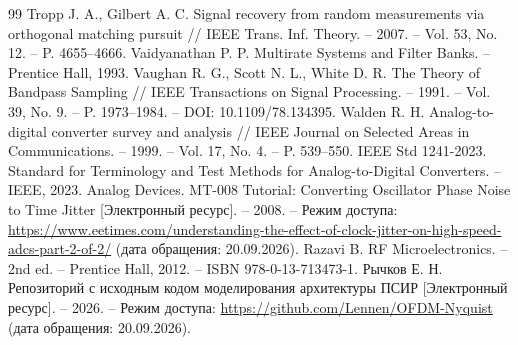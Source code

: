 \documentclass[a4paper,12pt]{article}
\numberwithin{equation}{section}
\begin{document}
\begin{thebibliography}{99}
Tropp J. A., Gilbert A. C. Signal recovery from random measurements via orthogonal matching pursuit // IEEE Trans. Inf. Theory. -- 2007. -- Vol. 53, No. 12. -- P. 4655--4666.
Vaidyanathan P. P. Multirate Systems and Filter Banks. -- Prentice Hall, 1993.
Vaughan R. G., Scott N. L., White D. R. The Theory of Bandpass Sampling // IEEE Transactions on Signal Processing. -- 1991. -- Vol. 39, No. 9. -- P. 1973--1984. -- DOI: 10.1109/78.134395.
Walden R. H. Analog-to-digital converter survey and analysis // IEEE Journal on Selected Areas in Communications. -- 1999. -- Vol. 17, No. 4. -- P. 539--550.
IEEE Std 1241-2023. Standard for Terminology and Test Methods for Analog-to-Digital Converters. -- IEEE, 2023.
Analog Devices. MT-008 Tutorial: Converting Oscillator Phase Noise to Time Jitter [Электронный ресурс]. -- 2008. -- Режим доступа: \url{https://www.eetimes.com/understanding-the-effect-of-clock-jitter-on-high-speed-adcs-part-2-of-2/} (дата обращения: 20.09.2026).
Razavi B. RF Microelectronics. -- 2nd ed. -- Prentice Hall, 2012. -- ISBN 978-0-13-713473-1.
Рычков Е. Н. Репозиторий с исходным кодом моделирования архитектуры ПСИР [Электронный ресурс]. -- 2026. -- Режим доступа: \url{https://github.com/Lennen/OFDM-Nyquist} (дата обращения: 20.09.2026).

\end{thebibliography}
\end{document}
